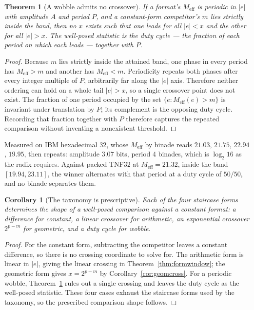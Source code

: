 \documentclass[11pt]{article}
\newtheorem{theorem}{Theorem}
\newtheorem{corollary}{Corollary}
\theoremstyle{definition}
\begin{document}
\begin{theorem}[A wobble admits no crossover]
\label{thm:wobblecross}
If a format's $M_{\mathrm{eff}}$ is periodic in $|e|$ with amplitude $A$ and
period $P$, and a constant-form competitor's $m$ lies strictly inside the band,
then no $x$ exists such that one leads for all $|e| < x$ and the other for all
$|e| > x$. The well-posed statistic is the duty cycle --- the fraction of each
period on which each leads --- together with $P$.
\end{theorem}
\begin{proof}
Because $m$ lies strictly inside the attained band, one phase in every period
has $M_{\mathrm{eff}}>m$ and another has $M_{\mathrm{eff}}<m$. Periodicity
repeats both phases after every integer multiple of $P$, arbitrarily far along
the $|e|$ axis. Therefore neither ordering can hold on a whole tail
$|e|>x$, so a single crossover point does not exist. The fraction of one
period occupied by the set $\{e:M_{\mathrm{eff}}(e)>m\}$ is invariant under
translation by $P$; its complement is the opposing duty cycle. Recording that
fraction together with $P$ therefore captures the repeated comparison without
inventing a nonexistent threshold.
\end{proof}

Measured on IBM hexadecimal 32, whose $M_{\mathrm{eff}}$ by binade reads
$21.03$, $21.75$, $22.94$, $19.95$, then repeats: amplitude $3.07$ bits, period
$4$ binades, which is $\log_2 16$ as the radix requires. Against packed TNF32 at
$M_{\mathrm{eff}} = 21.32$, inside the band $[19.94, 23.11]$, the winner
alternates with that period at a duty cycle of $50/50$, and no binade separates
them.

\begin{corollary}[The taxonomy is prescriptive]
\label{cor:taxprescribes}
Each of the four staircase forms determines the \emph{shape} of a well-posed
comparison against a constant format: a difference for constant, a linear
crossover for arithmetic, an exponential crossover $2^{p-m}$ for geometric, and a
duty cycle for wobble.
\end{corollary}
\begin{proof}
For the constant form, subtracting the competitor leaves a constant difference,
so there is no crossing coordinate to solve for.  The arithmetic form is linear
in $|e|$, giving the linear crossing in Theorem~\ref{thm:formwindow}; the
geometric form gives $x=2^{p-m}$ by Corollary~\ref{cor:geomcross}.  For a
periodic wobble, Theorem~\ref{thm:wobblecross} rules out a single crossing and
leaves the duty cycle as the well-posed statistic.  These four cases exhaust the
staircase forms used by the taxonomy, so the prescribed comparison shape follows.
\end{proof}
\end{document}
